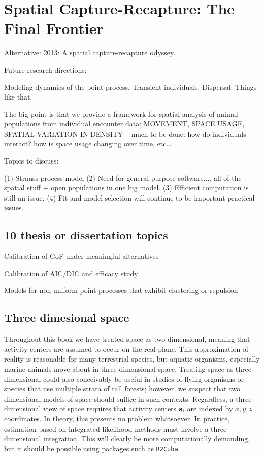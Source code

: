 


\chapter{Spatial Capture-Recapture: The Final Frontier}

\label{chapt.final}

\vspace{0.3cm}

Alternative: 2013: A spatial capture-recapture odyssey. 

Future research directions:

 Modeling dynamics of the point process. Transient individuals. 
 Dispersal. Things like that.

The big point is that we provide a framework for spatial analysis of animal populations from
individual encounter data:
MOVEMENT, SPACE USAGE, SPATIAL VARIATION IN DENSITY -- 
much to be done: how do individuals interact? how is space usage changing over time, etc...


Topics to discuss:

 (1) Strauss process model
 (2) Need for general purpose software.... all of the spatial stuff + 
open populations in one big model. 
 (3) Efficient computation is still an issue.
 (4) Fit and model selection will continue to be important practical
 issues.

\section{10 thesis or dissertation topics}

Calibration of GoF under meaningful alternatives

Calibration of AIC/DIC and efficacy study

Models for non-uniform point processes that exhibit clustering or
repulsion







\section{Three dimesional space}

Throughout this book we have treated space as
two-dimensional, meaning that activity centers are assumed to occur on
the real plane. This approximation of reality is reasonable for many
terrestrial species, but aquatic organisms, especially marine animals
move about in three-dimensional space. Treating space as
three-dimensional could also conceivably be useful in studies of flying organisms
or species that use multiple strata of tall forests; however, we
suspect that two dimensional models of space should suffice in such
contexts. Regardless, a three-dimensional view of space requires that
activity centers $\bf s_i$ are indexed by
$x,y,z$ coordinates. In theory, this presents no problem whatsoever. In
practice, estimation based on integrated likelihood methods must
involve a three-dimensional integration. This will clearly be more
computationally demanding, but it should be possible using packages
such as {\tt R2Cuba}.




